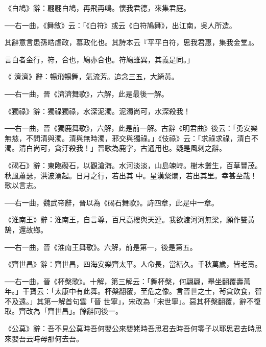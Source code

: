 \begin{pinyinscope}
 《白鳩》辭：翩翩白鳩，再飛再鳴。懷我君德，來集君庭。



 ──右一曲，《舞敘》云：「《白符》或云《白符鳩舞》，出江南，吳人所造。



 其辭意言患孫皓虐政，慕政化也。其詩本云『平平白符，思我君惠，集我金堂』。



 言白者金行，符，合也，鳩亦合也。符鳩雖異，其義是同。」



 《
 濟濟》辭：暢飛暢舞，氣流芳。追念三五，大綺黃。



 ──右一曲，晉《濟濟舞歌》，六解，此是最後一解。



 《獨祿》辭：獨祿獨祿，水深泥濁。泥濁尚可，水深殺我！



 ──右一曲，晉《獨鹿舞歌》，六解，此是前一解。古辭《明君曲》後云：「勇安樂無慈，不問清與濁。清與無時濁，邪交與獨祿。」《伎祿》云：「求祿求祿，清白不濁。清白尚可，貪汙殺我！」晉歌為鹿字，古通用也。疑是風刺之辭。



 《碣石》辭：東臨礙石，以觀滄海。水河淡淡，山島竦峙。樹木叢生，百草豐茂。秋風蕭瑟，洪波湧起。日月之行，若出其
 中。星漢粲爛，若出其里。幸甚至哉！歌以言志。



 ──右一曲，魏武帝辭，晉以為《碣石舞歌》。詩四章，此是中一章。



 《淮南王》辭：淮南王，自言尊，百尺高樓與天連。我欲渡河河無梁，願作雙黃鵠，還故鄉。



 ──右一曲，晉《淮南王舞歌》。六解，前是第一，後是第五。



 《齊世昌》辭：齊世昌，四海安樂齊太平。人命長，當結久。千秋萬歲，皆老壽。



 ──右一曲，晉《杯槃歌》。十解，第三解云：「舞杯槃，何翩翩，舉坐翻覆壽萬年。」干寶云：「太康中有此舞。杯槃翻覆，至危之像。言晉世之士，茍貪飲食，智不及遠。」其第一解首句雲「晉
 世寧」，宋改為「宋世寧」。惡其杯槃翻覆，辭不復取。齊改為「齊世昌」。餘辭同後一。



 《公莫》辭：吾不見公莫時吾何嬰公來嬰姥時吾思君去時吾何零子以耶思君去時思來嬰吾云時母那何去吾。




\end{pinyinscope}
